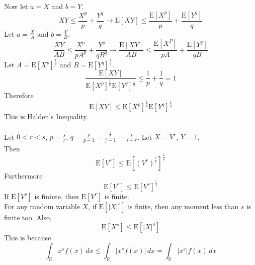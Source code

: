 \documentclass[12pt]{article}
\newcommand{\expected}[1]{\mathrm{E}[#1]}
\begin{document}
Now let $a = X$ and $b = Y$. 
$$ XY \leq \frac{X^p}{p} + \frac{Y^q}{q} \to \expected{XY} \leq \frac{\expected{X^p}}{p} + \frac{\expected{Y^q}}{q} $$ 
Let $a = \frac{X}{A}$ and $b = \frac{Y}{B}$. 
$$ \frac{XY}{AB} \leq \frac{X^p}{pA^p} + \frac{Y^q}{qB^q} \to \frac{\expected{XY}}{AB} \leq \frac{\expected{X^P}}{pA} + \frac{\expected{Y^q}}{qB} $$ 
Let $A = \expected{X^p}^{\frac{1}{p}}$ and $B = \expected{Y^q}^{\frac{1}{q}}$. 
$$ \frac{\expected{XY}}{\expected{X^p}^{\frac{1}{p}}\expected{Y^q}^{\frac{1}{q}}} \leq \frac{1}{p} + \frac{1}{q} = 1 $$
 Therefore $$\expected{XY} \leq \expected{X^p}^{\frac{1}{p}} \expected{Y^q}^{\frac{1}{q}}$$ 
 This is Halden's Inequality. \\~\\
 Let $0 < r < s$, $p = \frac{s}{r}$, $q = \frac{p}{p-1} = \frac{\frac{s}{r}}{\frac{s}{r} - 1} = \frac{s}{s-r}$. Let $X = V^r$, $Y = 1$. \\
 Then $$ \expected{V^r} \leq \expected{(V^r)^{\frac{s}{r}}}^{\frac{1}{\frac{s}{r}}}$$ 
 Furthermore $$\expected{V^r} \leq \expected{V^s}^{\frac{r}{s}} $$ 
 If $\expected{V^s}$ is fininte, then $\expected{V^r}$ is finite. \\
 For any random variable $X$, if $\expected{|X|^s}$ is finite, then any moment less than $s$ is finite too. Also, $$ \expected{X^s} \leq \expected{|X|^s}$$ 
 This is because $$ \int_{\mathbb{R}} x^s f(x) \, dx \leq \int_{\mathbb{R}} |x^s f(x)| \, dx = \int_{\mathbb{R}} |x^s| f(x) \, dx $$ \\~\\
 
\end{document}
